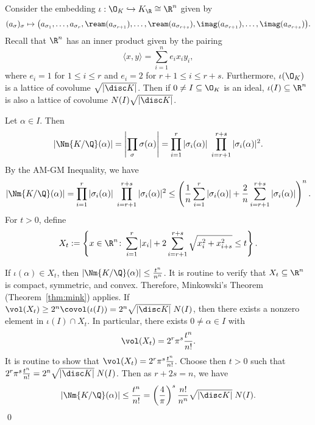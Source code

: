 \finite*

\pf Consider the embedding $\iota: \O_K \hookrightarrow K_\R \cong \R^n$ given by
	\[
	(a_\sigma)_\sigma \mapsto \big(a_{\sigma_1}, \ldots, a_{\sigma_r}, \ream(a_{\sigma_{r+1}}), \ldots, \ream(a_{\sigma_{r+s}}), \imag(a_{\sigma_{r+1}}), \ldots, \imag(a_{\sigma_{r+s}}) \big).
	\]
Recall that $\R^n$ has an inner product given by the pairing
	\[
	\langle x,y \rangle= \sum_{i=1}^n e_i x_iy_i,
	\]
where $e_i=1$ for $1 \leq i \leq r$ and $e_i=2$ for $r+1 \leq i \leq r+s$. Furthermore, $\iota(\O_K)$ is a lattice of covolume $\sqrt{|\disc K|}$. Then if $0 \neq I \subseteq \O_K$ is an ideal, $\iota(I) \subseteq \R^n$ is also a lattice of covolume $N(I) \sqrt{|\disc K|}$. 

Let $\alpha \in I$. Then
	\[
	|\Nm{K/\Q}(\alpha)|= \left| \prod_\sigma \sigma(\alpha) \right|= \prod_{i=1}^r |\sigma_i(\alpha)| \; \prod_{i=r+1}^{r+s} |\sigma_i(\alpha)|^2.
	\]
By the AM-GM Inequality, we have
	\[
	|\Nm{K/\Q}(\alpha)|= \prod_{i=1}^r |\sigma_i(\alpha)| \; \prod_{i=r+1}^{r+s} |\sigma_i(\alpha)|^2 \leq \left( \dfrac{1}{n} \sum_{i=1}^r |\sigma_i(\alpha)| + \dfrac{2}{n} \sum_{i=r+1}^{r+s} |\sigma_i(\alpha)| \right)^n.
	\]
For $t>0$, define
	\[
	X_t:= \left\{ x \in \R^n \colon \sum_{i=1}^r |x_i| + 2 \sum_{i=r+1}^{r+s} \sqrt{x_i^2+x_{i+s}^2} \leq t \right\}. 
	\]

If $\iota(\alpha) \in X_t$, then $|\Nm{K/\Q}(\alpha)| \leq \frac{t^n}{n^n}$. It is routine to verify that $X_t \subseteq \R^n$ is compact, symmetric, and convex. Therefore, Minkowski's Theorem (Theorem~\ref{thm:mink}) applies. If $\vol(X_t) \geq 2^n \covol(\iota(I))= 2^n \sqrt{|\disc K|} \; N(I)$, then there exists a nonzero element in $\iota(I) \cap X_t$. In particular, there exists $0 \neq \alpha \in I$ with
	\[
	\vol(X_t)= 2^r \pi^s \dfrac{t^n}{n!}.
	\]
It is routine to show that $\vol(X_t)= 2^r \pi^s \frac{t^n}{n!}$. Choose then $t>0$ such that $2^r \pi^s \frac{t^n}{n!}=2^n \sqrt{|\disc K|} \;N(I)$. Then as $r+2s=n$, we have
	\[
	|\Nm{K/\Q}(\alpha)| \leq \dfrac{t^n}{n!}= \left(\dfrac{4}{\pi}\right)^s \dfrac{n!}{n^n} \sqrt{|\disc K|} \;N(I).
	\]
\qed \\


